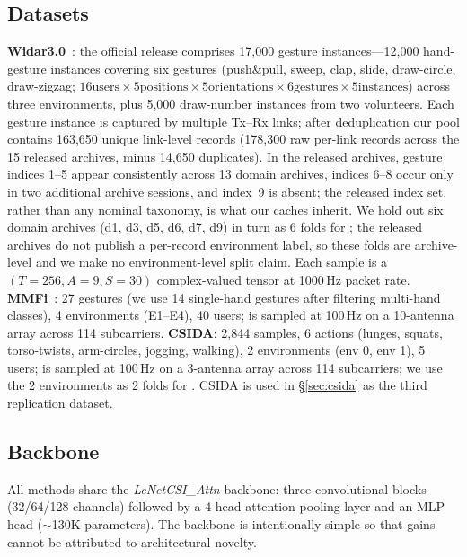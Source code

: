 \documentclass[journal,11pt]{IEEEtran}
\newcommand{\CSI}{\text{CSI}}
\newcommand{\LODO}{\text{LODO}}
\begin{document}
\subsection{Datasets}
\textbf{Widar3.0}~\cite{zheng2019widar}: the official release comprises 17{,}000 gesture instances---12{,}000 hand-gesture instances covering six gestures (push\&pull, sweep, clap, slide, draw-circle, draw-zigzag; $16 \text{users} \times 5 \text{positions} \times 5 \text{orientations} \times 6 \text{gestures} \times 5 \text{instances}$) across three environments, plus 5{,}000 draw-number instances from two volunteers. Each gesture instance is captured by multiple Tx--Rx links; after deduplication our pool contains 163{,}650 unique link-level records (178{,}300 raw per-link records across the 15 released archives, minus 14{,}650 duplicates). In the released archives, gesture indices 1--5 appear consistently across 13 domain archives, indices 6--8 occur only in two additional archive sessions, and index~9 is absent; the released index set, rather than any nominal taxonomy, is what our caches inherit. We hold out six domain archives (d1, d3, d5, d6, d7, d9) in turn as 6 folds for \LODO; the released archives do not publish a per-record environment label, so these folds are archive-level and we make no environment-level split claim. Each sample is a $(T{=}256, A{=}9, S{=}30)$ complex-valued \CSI{} tensor at 1000\,Hz packet rate. \textbf{MMFi}~\cite{yang2023mmfi}: 27 gestures (we use 14 single-hand gestures after filtering multi-hand classes), 4 environments (E1--E4), 40 users; \CSI{} is sampled at 100\,Hz on a 10-antenna array across 114 subcarriers. \textbf{CSIDA}: 2,844 samples, 6 actions (lunges, squats, torso-twists, arm-circles, jogging, walking), 2 environments (env 0, env 1), 5 users; \CSI{} is sampled at 100\,Hz on a 3-antenna array across 114 subcarriers; we use the 2 environments as 2 folds for \LODO. CSIDA is used in \S\ref{sec:csida} as the third replication dataset.

\subsection{Backbone}
All methods share the \textit{LeNetCSI\_Attn} backbone: three convolutional blocks (32/64/128 channels) followed by a 4-head attention pooling layer and an MLP head ($\sim$130K parameters). The backbone is intentionally simple so that gains cannot be attributed to architectural novelty.
\end{document}
